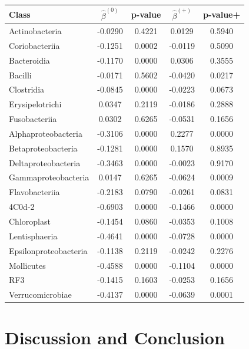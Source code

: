 \documentclass[12pt]{article}
\begin{document}
\begin{singlespace}
  \begin{tabular}{|l|c c|c c|}
\hline
Class & $\hat\beta^{(0)}$ & p-value & $\hat\beta^{(+)}$ & p-value+\\
\hline
Actinobacteria & -0.0290 & 0.4221 & 0.0129 & 0.5940\\
Coriobacteriia & -0.1251 & \cellcolor{Orchid}0.0002 & -0.0119 & 0.5090\\
Bacteroidia & -0.1170 & \cellcolor{Orchid}0.0000 & 0.0306 & 0.3555\\
Bacilli & -0.0171 & 0.5602 & -0.0420 & \cellcolor{Orchid}0.0217\\
Clostridia & -0.0845 & \cellcolor{Orchid}0.0000 & -0.0223 & 0.0673\\
Erysipelotrichi & 0.0347 & 0.2119 & -0.0186 & 0.2888\\
Fusobacteriia & 0.0302 & 0.6265 & -0.0531 & 0.1656\\
Alphaproteobacteria & -0.3106 & \cellcolor{Orchid}0.0000 & 0.2277 & \cellcolor{Orchid}0.0000\\
Betaproteobacteria & -0.1281 & \cellcolor{Orchid}0.0000 & 0.1570 & 0.8935\\
Deltaproteobacteria & -0.3463 & \cellcolor{Orchid}0.0000 & -0.0023 & 0.9170\\
Gammaproteobacteria & 0.0147 & 0.6265 & -0.0624 & \cellcolor{Orchid}0.0009\\
Flavobacteriia & -0.2183 & 0.0790 & -0.0261 & 0.0831\\
4C0d-2 & -0.6903 &\cellcolor{Orchid} 0.0000 & -0.1466 & \cellcolor{Orchid}0.0000\\
Chloroplast & -0.1454 & 0.0860 & -0.0353 & 0.1008\\
Lentisphaeria & -0.4641 &\cellcolor{Orchid} 0.0000 & -0.0728 & \cellcolor{Orchid}0.0000\\
Epsilonproteobacteria & -0.1138 & 0.2119 & -0.0242 & 0.2276\\
Mollicutes & -0.4588 &\cellcolor{Orchid} 0.0000 & -0.1104 & \cellcolor{Orchid}0.0000\\
RF3 & -0.1415 & 0.1603 & -0.0253 & 0.1656\\
Verrucomicrobiae & -0.4137 & \cellcolor{Orchid}0.0000 & -0.0639 & \cellcolor{Orchid}0.0001\\
\hline
\end{tabular}
\end{singlespace}






\section{Discussion and Conclusion}
\end{document}
